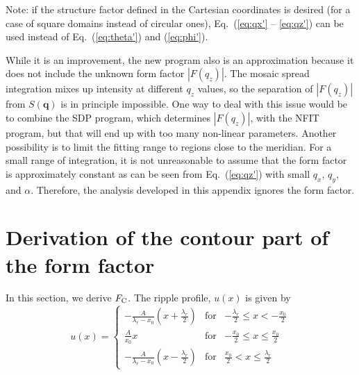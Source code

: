 Note: if the structure factor defined in the Cartesian coordinates is desired
(for a case of square domains instead of circular ones),
Eq.~(\ref{eq:qx'} -- \ref{eq:qz'}) can be used instead of 
Eq.~(\ref{eq:theta'}) and (\ref{eq:phi'}).

While it is an improvement, the new program also is an approximation because 
it does not include the unknown form factor $|F(q_z)|$. 
The mosaic spread integration mixes up intensity at different $q_z$ values, so
the separation of $|F(q_z)|$ from $S(\mathbf{q})$ is in principle impossible. 
One way to deal with this issue would be to combine the SDP program, 
which determines $|F(q_z)|$, with the NFIT program, but
that will end up with too many non-linear parameters.
Another possibility is to limit the fitting range to regions close to the meridian.
For a small range of integration, it is not unreasonable to assume that
the form factor is approximately constant as can be seen from 
Eq.~(\ref{eq:qz'}) with small $q_x$, $q_y$, and $\alpha$. 
Therefore, the analysis developed in this appendix ignores the form factor.

\newpage
\section{Derivation of the contour part of the form factor}
In this section, we derive $F_\mathrm{C}$. The ripple profile, $u(x)$ is given by
\begin{equation}
  u(x) = \left\{
    \begin{array}{ccc}
    -\frac{A}{\lambda_r-x_0}\left(x+\frac{\lambda_r}{2}\right) 
      & \text{for} 
      & -\frac{\lambda_r}{2} \leq x < -\frac{x_0}{2} \\
    \frac{A}{x_0}x 
      & \text{for} 
      & -\frac{x_0}{2} \leq x \leq \frac{x_0}{2} \\
    -\frac{A}{\lambda_r-x_0} \left(x-\frac{\lambda_r}{2}\right)
      & \text{for} 
      & \frac{x_0}{2} < x \leq \frac{\lambda_r}{2}
    \end{array} \right.
\end{equation}

